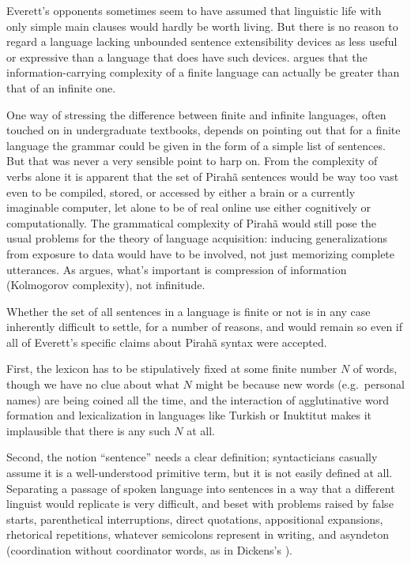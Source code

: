 \documentclass[output=paper,colorlinks,citecolor=brown
]{langscibook}
\begin{document}
Everett's opponents sometimes seem to have assumed that linguistic
life with only simple main clauses would hardly be worth living.
But there is no reason to regard a language lacking unbounded sentence
extensibility devices as less useful or expressive than a language that does have such devices.
\citet{Kornai14} argues that the information-carrying complexity of
a finite language can actually be greater than that of an infinite one.

One way of stressing the difference between finite and infinite languages,
often touched on in undergraduate textbooks, depends on pointing out that
for a finite language the grammar could be given in the form of a simple
list of sentences. But that was never a very sensible point to harp on.
From the complexity of verbs alone \citep[288--301]{Everett86HAL}
it is apparent that the set of Pirahã sentences would be way too vast
even to be compiled, stored, or accessed by either a brain or a currently
imaginable computer, let alone to be of real online use either cognitively
or computationally. The grammatical complexity of Pirahã would still
pose the usual problems for the theory of language acquisition: inducing
generalizations from exposure to data would have to be involved, not just
memorizing complete utterances. As  argues, what's
important is compression of information (Kolmogorov complexity), not
infinitude.

Whether the set of all sentences in a language is finite or not is
in any case inherently difficult to settle, for a number of reasons,
and would remain so even if all of Everett's specific claims about
Pirahã syntax were accepted.

First, the lexicon has to be stipulatively fixed at some finite number
$N$ of words, though we have no clue about what $N$ might be because
new words (e.g.\ personal names) are being coined all the time, and
the interaction of agglutinative word formation and lexicalization
in languages like Turkish or Inuktitut makes it implausible that there
is any such $N$ at all.

Second, the notion ``sentence'' needs a clear definition; syntacticians
casually assume it is a well-understood primitive term, but it is not
easily defined at all. Separating a passage of spoken language into
sentences in a way that a different linguist would replicate is very
difficult, and beset with problems raised by false starts,
parenthetical interruptions, direct quotations, appositional
expansions, rhetorical repetitions, whatever semicolons represent in
writing, and asyndeton (coordination without coordinator words, as
in Dickens's ).
\end{document}
